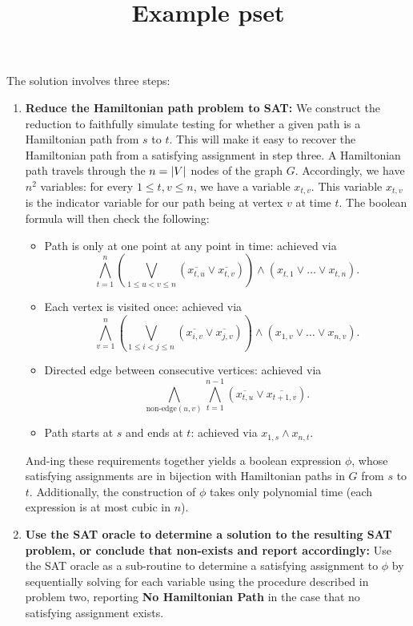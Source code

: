 \documentclass{scrartcl}
\title{Example pset}
\begin{document}
\maketitle

\newpsetproblem
\begin{problem}
\end{problem}
\begin{solution}
The solution involves three steps:
\begin{enumerate}[label=(\arabic*)]
    \item \textbf{Reduce the Hamiltonian path problem to SAT:} We construct the reduction to faithfully simulate testing for whether a given path is a Hamiltonian path from $s$ to $t$. This will make it easy to recover the Hamiltonian path from a satisfying assignment in step three. A Hamiltonian path travels through the $n=\lvert V\rvert$ nodes of the graph $G$. Accordingly, we have $n^2$ variables: for every $1\le t,v \le n$, we have a variable $x_{t,v}$. This variable $x_{t,v}$ is the indicator variable for our path being at vertex $v$ at time $t$. The boolean formula will then check the following:
    \begin{itemize}
        \item Path is only at one point at any point in time: achieved via 
        \[\bigwedge_{t=1}^n \left(\bigvee_{1\le u<v \le n} (\overline{x_{t,u}}\lor \overline{x_{t,v}})\right) \land (x_{t,1}\lor \dots \lor x_{t,n}).\]
        \item Each vertex is visited once: achieved via 
        \[\bigwedge_{v=1}^n \left(\bigvee_{1\le i<j \le n} (\overline{x_{i,v}}\lor \overline{x_{j,v}})\right) \land (x_{1,v}\lor \dots \lor x_{n,v}).\]
        \item Directed edge between consecutive vertices: achieved via
        \[\bigwedge_{\text{non-edge} (u,v)}\bigwedge_{t=1}^{n-1} (\overline{x_{t,u}}\lor\overline{x_{t+1,v}}).\]
        \item Path starts at $s$ and ends at $t$: achieved via $x_{1,s}\land x_{n,t}$.
    \end{itemize}
    And-ing these requirements together yields a boolean expression $\phi$, whose satisfying assignments are in bijection with Hamiltonian paths in $G$ from $s$ to $t$. Additionally, the construction of $\phi$ takes only polynomial time (each expression is at most cubic in $n$).
    \item \textbf{Use the SAT oracle to determine a solution to the resulting SAT problem, or conclude that non-exists and report accordingly:} Use the SAT oracle as a sub-routine to determine a satisfying assignment to $\phi$ by sequentially solving for each variable using the procedure described in problem two, reporting \textbf{No Hamiltonian Path} in the case that no satisfying assignment exists.

\end{enumerate}
\end{solution}
\end{document}
